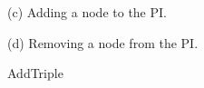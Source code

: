 \documentclass[abstracton,12pt]{scrreprt}
\begin{document}
\begin{figure}
\begin{multicols}{2}
\begin{algorithm}[H]
\begin{footnotesize}
            \end{footnotesize}
        \end{algorithm}
    \end{multicols}
    \begin{multicols}{2}
        \begin{center}(c) Adding a node to the PI.\end{center}

        \begin{algorithm}[H]
            \label{algo:add_triple}
            \caption{AddTriple}
            \DontPrintSemicolon
            \begin{scriptsize}
                \vspace{2.2mm}
            \end{scriptsize}
        \end{algorithm}
        \columnbreak
        \begin{center}(d) Removing a node from the PI.\end{center}


\end{multicols}
\end{figure}
\end{document}
